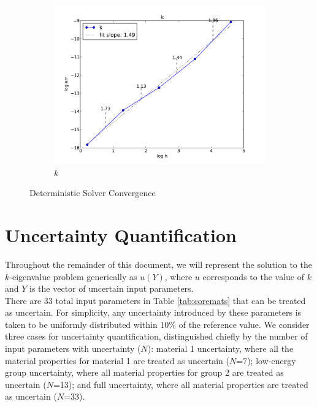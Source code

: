 \documentclass[11pt]{article}
\begin{document}
\begin{figure}[H]
\begin{subfigure}[b]{0.3 \textwidth}
   \includegraphics[width=\textwidth]{k}
   \caption{$k$}
   \label{kconv}
  \end{subfigure}
  \caption{Deterministic Solver Convergence}
  \label{det-conv}
\end{figure}


\section{Uncertainty Quantification}
Throughout the remainder of this document, we will represent the solution to the $k$-eigenvalue problem generically as $u(Y)$, where $u$ corresponds to the value of $k$ and $Y$ is the vector of uncertain input parameters.\\

There are 33 total input parameters in Table \ref{tab:coremats} that can be treated as uncertain.  For simplicity, any uncertainty introduced by these parameters is taken to be uniformly distributed within 10\% of the reference value.  We consider three cases for uncertainty quantification, distinguished chiefly by the number of input parameters with uncertainty ($N$): material 1 uncertainty, where all the material properties for material 1 are treated as uncertain ($N$=7); low-energy group uncertainty, where all material properties for group 2 are treated as uncertain ($N$=13); and full uncertainty, where all material properties are treated as uncertain ($N$=33).\\
\end{document}

